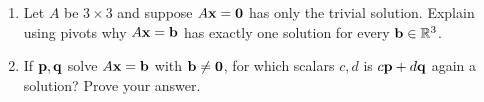 \documentclass[11pt]{article}
\begin{document}
\begin{enumerate}
  \item Let $A$ be $3\times3$ and suppose $A\mathbf{x}=\mathbf{0}$ has only the trivial solution. Explain using pivots why $A\mathbf{x}=\mathbf{b}$ has exactly one solution for every $\mathbf{b}\in\mathbb{R}^3$.
  \item If $\mathbf{p},\mathbf{q}$ solve $A\mathbf{x}=\mathbf{b}$ with $\mathbf{b}\neq\mathbf{0}$, for which scalars $c,d$ is $c\mathbf{p}+d\mathbf{q}$ again a solution? Prove your answer.
\end{enumerate}
\end{document}

